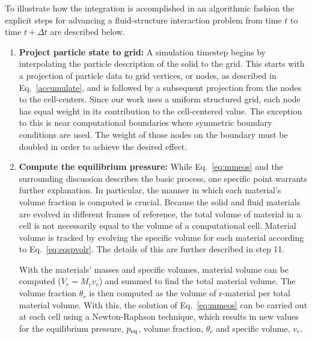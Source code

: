 To illustrate how the integration is accomplished in an algorithmic fashion 
the explicit steps for advancing a fluid-structure interaction problem from 
time $t$ to time $t+\Delta{t}$ are described below.
\begin{enumerate}


\item {\bf Project particle state to grid:} A simulation timestep begins by
interpolating the particle description of the solid to the grid.  This starts
with a projection of particle data to grid vertices, or nodes, as described
in Eq.~\ref{accumulate}, and is followed by a subsequent projection from
the nodes to the cell-centers.  Since our work uses a uniform structured
grid, each node has equal weight in its contribution to the cell-centered
value.  The exception to this is near computational boundaries where
symmetric boundary conditions are used.  The weight of those nodes on
the boundary must be doubled in order to achieve the desired effect.

\item {\bf Compute the equilibrium pressure:} While Eq.~\ref{eq:mmeos} and the
surrounding discussion describes the basic process, one specific point warrants
further explanation.  In particular, the manner in which each material's
volume fraction is computed is crucial.  Because the solid and fluid materials 
are evolved in different frames of reference, the total volume of material in a 
cell is not necessarily equal to the volume of a computational cell.  Material 
volume is tracked by evolving the specific volume for each material 
according to Eq.~\ref{eq:eqspvolr}.
The details of this are further described in step 11.

With the materials' masses and specific volumes, material volume
can be computed ($V_r=M_r v_r$) and summed to find the total material volume.  The volume
fraction $\theta_r$ is then computed as the volume of r-material per total
material volume.  With this, the solution of Eq.~\ref{eq:mmeos} can be carried
out at each cell using a Newton-Raphson technique\cite{Harlow1975},
which results in new values for the equilibrium pressure, $p_{\text{eq}}$,
volume fraction, $\theta_r$ and specific volume, $v_r$.


\end{enumerate}
